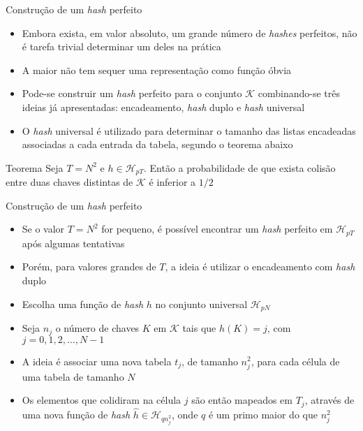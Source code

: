 \begin{frame}[fragile]{Construção de um {\it hash} perfeito}

    \begin{itemize}
        \item Embora exista, em valor absoluto, um grande número de \textit{hashes} perfeitos,
            não é tarefa trivial determinar um deles na prática

        \item A maior não tem sequer uma representação como função óbvia

        \item Pode-se construir um \textit{hash} perfeito para o conjunto $\mathcal{K}$
            combinando-se três ideias já apresentadas: encadeamento, \textit{hash} duplo e 
                \textit{hash} universal

        \item O \textit{hash} universal é utilizado para determinar o tamanho das listas
            encadeadas associadas a cada entrada da tabela, segundo o teorema abaixo
    \end{itemize}

    \begin{block}{Teorema}
        Seja $T = N^2$ e $h \in \mathcal{H}_{pT}$. Então a probabilidade de que exista
        colisão entre duas chaves distintas de $\mathcal{K}$ é inferior a $1/2$
    \end{block}
	
\end{frame}

\begin{frame}[fragile]{Construção de um {\it hash} perfeito}

    \begin{itemize}
        \item Se o valor $T = N^2$ for pequeno, é possível encontrar um \textit{hash} perfeito em
            $\mathcal{H}_{pT}$ após algumas tentativas

        \item Porém, para valores grandes de $T$, a ideia é utilizar o encadeamento com
            \textit{hash} duplo

        \item Escolha uma função de \textit{hash} $h$ no conjunto universal $\mathcal{H}_{pN}$
 
        \item Seja $n_j$ o número de chaves $K$ em $\mathcal{K}$ tais que $h(K) = j$, com
            $j = 0, 1, 2, \ldots, N - 1$

        \item A ideia é associar uma nova tabela $t_j$, de 
            tamanho $n_j^2$, para cada célula de uma tabela de tamanho $N$

        \item Os elementos que colidiram na célula $j$ são então mapeados em $T_j$, através de uma
            nova função de \textit{hash} $\hat{h}\in \mathcal{H}_{qn_j^2}$, onde $q$ é um
            primo maior do que $n_j^2$
    \end{itemize}

\end{frame}

